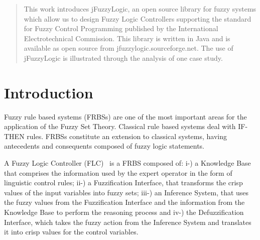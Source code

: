 \documentclass[conference]{IEEEtran}
\begin{document}
\begin{abstract}
This work introduces jFuzzyLogic, an open source library for fuzzy systems which allow us to design Fuzzy Logic Controllers supporting the standard for Fuzzy Control Programming published by the International Electrotechnical Commission. 
This library is written in Java and is available as open source from jfuzzylogic.sourceforge.net. 
The use of jFuzzyLogic is illustrated through the analysis of one case study. 
\end{abstract}



%
\IEEEpeerreviewmaketitle

\section{Introduction}

Fuzzy rule based systems (FRBSs) are one of the most important areas for the application of the Fuzzy Set Theory\cite{Zadeh65}. 
Classical rule based systems deal with IF-THEN rules.
FRBSs constitute an extension to classical systems, having antecedents and consequents composed of fuzzy logic statements.

A Fuzzy Logic Controller (FLC)~\cite{Lee90,DHR93,YF94,Bon94} is a FRBS composed of: 
	i-) a Knowledge Base that comprises the information used by the expert operator in the form of linguistic control rules; 
	ii-) a Fuzzification Interface, that transforms the crisp values of the input variables into fuzzy sets;
	iii-) an Inference System, that uses the fuzzy values from the Fuzzification Interface and the information from the Knowledge Base to perform the reasoning process and 
	iv-) the Defuzzification Interface, which takes the fuzzy action from the Inference System and translates it into crisp values for the control variables.
\end{document}

